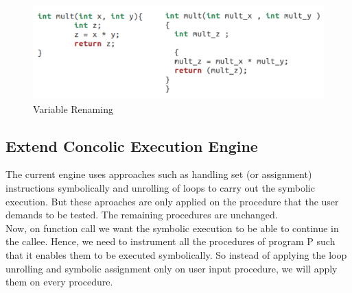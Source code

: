 \documentclass[12pt,oneside]{book}
\begin{document}
\begin{figure}[htbp]
\centering
\includegraphics[scale=0.45]{renamed1.png}
\caption{Variable Renaming}
\end{figure}  

\newpage

\subsection{Extend Concolic Execution Engine}
The current engine uses approaches such as handling set (or assignment) instructions symbolically and unrolling of loops to carry out the symbolic execution. But these aproaches are only applied on the procedure that the user demands to be tested. The remaining procedures are unchanged.\\
Now, on function call we want the symbolic execution to be able to continue in the callee. Hence, we need to instrument all the procedures of program P such that it enables them to be executed symbolically. So instead of applying the loop unrolling and symbolic assignment only on user input procedure, we will apply them on every procedure.

\end{document}
